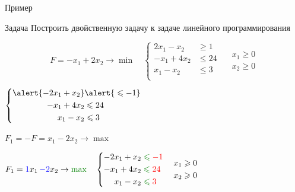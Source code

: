\documentclass[unicode,11pt,notheorems,xcolor=table]{beamer}
\begin{document}
\begin{frame}[allowframebreaks]{Пример}
\begin{block}{Задача}
Построить двойственную задачу к задаче линейного программирования

$$
F=-x_1+2x_2 \to\min
\quad
\left\lbrace
  \begin{aligned}
     2x_1-x_2 & \geqslant 1\\
     -x_1+4x_2 & \leqslant 24\\
     x_1-x_2 & \leqslant 3\\
  \end{aligned}  \right.\quad
  \begin{aligned}
    x_1 \geqslant 0\\
    x_2 \geqslant 0
  \end{aligned}   
 $$
 \end{block}


{\centering $\left\lbrace
  \begin{aligned}
     \alert{-2x_1+x_2 }& \alert{\;\leqslant -1}\\
     -x_1+4x_2 & \leqslant 24\\
     x_1-x_2 & \leqslant 3\\
  \end{aligned}  \right.\quad
$\par}


{\centering $F_1=-F=x_1-2x_2 \to \max$\par}

\framebreak

{\centering$
F_1={\color{blue}1}x_1 {\color{blue}\,-2}x_2 \to {\color{green!50!black} \max}
\quad
\left\lbrace
  \begin{aligned}
     -2x_1+x_2 & \color{green!50!black} \leqslant \color{red}-1\\
     -x_1+4x_2 & \color{green!50!black}\leqslant \color{red}24\\
     x_1-x_2 & \color{green!50!black}\leqslant \color{red}3\\
  \end{aligned}  \right.\quad
  \begin{aligned}
    x_1 \geqslant 0\\
    x_2 \geqslant 0
  \end{aligned}   
$\par}


\end{frame}
\end{document}
